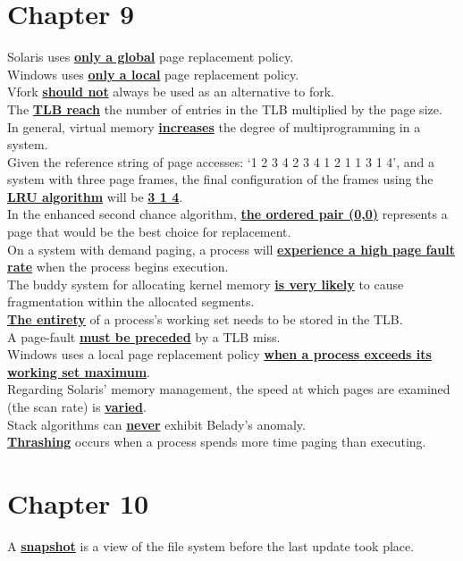 \documentclass[10pt]{article}
\newcommand{\qw}[1]{\textbf{\ul{#1}}}
\begin{document}
\section*{\centering Chapter 9}
Solaris uses \qw{only a global} page replacement policy.\\[2mm]
Windows uses \qw{only a local} page replacement policy.\\[2mm]
Vfork \qw{should not} always be used as an alternative to fork.\\[2mm]
The \qw{TLB reach} the number of entries in the TLB multiplied by the page size.\\[2mm]
In general, virtual memory \qw{increases} the degree of multiprogramming in a system.\\[2mm]
Given the reference string of page accesses: `1 2 3 4 2 3 4 1 2 1 1 3 1 4', and a system with three page frames, the final configuration of the frames using the \qw{LRU algorithm} will be \qw{3 1 4}.\\[2mm]
In the enhanced second chance algorithm, \qw{the ordered pair (0,0)} represents a page that would be the best choice for replacement.\\[2mm]
On a system with demand paging, a process will \qw{experience a high page fault rate} when the process begins execution.\\[2mm]
The buddy system for allocating kernel memory \qw{is very likely} to cause fragmentation within the allocated segments.\\[2mm]
\qw{The entirety} of a process's working set needs to be stored in the TLB.\\[2mm]
A page-fault \qw{must be preceded} by a TLB miss.\\[2mm]
Windows uses a local page replacement policy \qw{when a process exceeds its working set maximum}.\\[2mm]
Regarding Solaris' memory management, the speed at which pages are examined (the scan rate) is \qw{varied}.\\[2mm]
Stack algorithms can \qw{never} exhibit Belady's anomaly.\\[2mm]
\qw{Thrashing} occurs when a process spends more time paging than executing.\\[2mm]
\newpage



\section*{\centering Chapter 10}
A \qw{snapshot} is a view of the file system before the last update took place.\\[2mm]
\newpage
\end{document}
